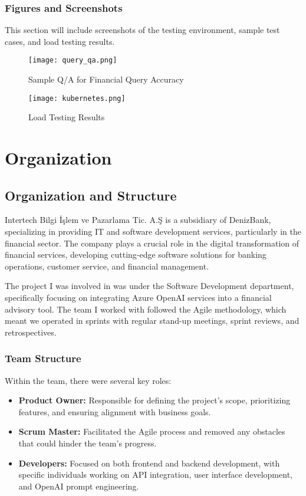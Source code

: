 \documentclass[a4paper,12pt]{report}
\begin{document}
\subsection*{Figures and Screenshots}
This section will include screenshots of the testing environment, sample test cases, and load testing results.

\begin{figure}[H]
    \centering
    \texttt{[image: query\_qa.png]}
    \caption{Sample Q/A for Financial Query Accuracy}
    \label{fig:test-cases}
\end{figure}

\begin{figure}[H]
    \centering
    \texttt{[image: kubernetes.png]}
    \caption{Load Testing Results}
    \label{fig:load-testing}
\end{figure}


\chapter{Organization}

\section{Organization and Structure}
Intertech Bilgi İşlem ve Pazarlama Tic. A.Ş is a subsidiary of DenizBank, specializing in providing IT and software development services, particularly in the financial sector. The company plays a crucial role in the digital transformation of financial services, developing cutting-edge software solutions for banking operations, customer service, and financial management.

The project I was involved in was under the Software Development department, specifically focusing on integrating Azure OpenAI services into a financial advisory tool. The team I worked with followed the Agile methodology, which meant we operated in sprints with regular stand-up meetings, sprint reviews, and retrospectives.

\subsection*{Team Structure}
Within the team, there were several key roles:
\begin{itemize}
    \item \textbf{Product Owner:} Responsible for defining the project’s scope, prioritizing features, and ensuring alignment with business goals.
    \item \textbf{Scrum Master:} Facilitated the Agile process and removed any obstacles that could hinder the team's progress.
    \item \textbf{Developers:} Focused on both frontend and backend development, with specific individuals working on API integration, user interface development, and OpenAI prompt engineering.
\end{itemize}
\end{document}
